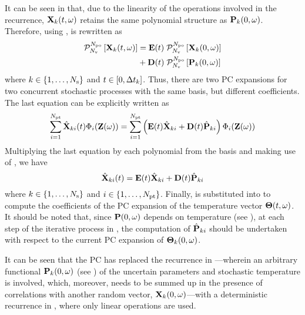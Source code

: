 It can be seen in  that, due to the linearity of the operations involved in the recurrence, $\mathbf{X}_k(t, \omega)$ retains the same polynomial structure as $\mathbf{P}_k(0, \omega)$. Therefore, using ,  is rewritten as
\begin{align*}
  \oPC{\vars}{\pcorder}{\vX_k(\t, \o)} & = \mE(\t) \; \oPC{\vars}{\pcorder}{\vX_k(0, \o)} \\
  & {} + \mD(\t) \; \oPC{\vars}{\pcorder}{\vP_k(0, \o)}
\end{align*}
where $k \in \{ 1, \dotsc, N_\text{s} \}$ and $t \in [0, \Delta t_k]$. Thus, there are two PC expansions for two concurrent stochastic processes with the same basis, but different coefficients. The last equation can be explicitly written as
\[
  \sum_{i = 1}^{\pcterms} \pcc{\vX}_{ki}(\t) \pcb_i(\vZ(\o)) = \sum_{i = 1}^{\pcterms} \left( \mE(\t) \pcc{\vX}_{ki} + \mD(\t) \pcc{\vP}_{ki} \right) \pcb_i(\vZ(\o))
\]
Multiplying the last equation by each polynomial from the basis and making use of , we have
\begin{equation} \elabel{pc-recurrence}
  \pcc{\vX}_{ki}(\t) = \mE(\t) \pcc{\vX}_{ki} + \mD(\t) \pcc{\vP}_{ki}
\end{equation}
where $k \in \{ 1, \dots, N_\text{s} \}$ and $i \in \{ 1, \dotsc, {N_\text{pt}} \}$. Finally,  is substituted into  to compute the coefficients of the PC expansion of the temperature vector ${\boldsymbol\Theta}(t, \omega)$. It should be noted that, since $\mathbf{P}(0, \omega)$ depends on temperature (see ), at each step of the iterative process in , the computation of $\hat{\mathbf{P}}_{ki}$ should be undertaken with respect to the current PC expansion of ${\boldsymbol\Theta}_k(0, \omega)$.

It can be seen that the PC has replaced the recurrence in ---wherein an arbitrary functional $\mathbf{P}_k(0, \omega)$ (see ) of the uncertain parameters and stochastic temperature is involved, which, moreover, needs to be summed up in the presence of correlations with another random vector, $\mathbf{X}_k(0, \omega)$---with a deterministic recurrence in , where only linear operations are used.
